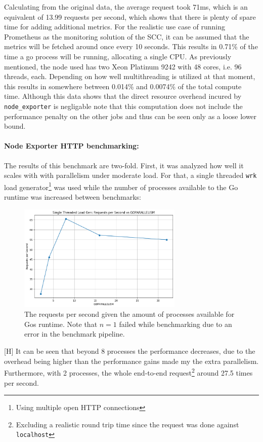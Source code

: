 Calculating from the original data, the average request took 71ms, which is an equivalent of 13.99 requests per second, which shows that there is plenty of spare time for adding additional metrics. For the realistic use case of running Prometheus as the monitoring solution of the \ac{SCC}, it can be assumed that the metrics will be fetched around once every 10 seconds. This results in 0.71\% of the time a go process will be running, allocating a single CPU. As previously mentioned, the node used has two Xeon Platinum 9242 with 48 cores, i.e. 96 threads, each. Depending on how well multithreading is utilized at that moment, this results in somewhere between 0.014\% and 0.0074\% of the total compute time. Although this data shows that the direct resource overhead incured by \texttt{node\_exporter} is negligable note that this computation does not include the performance penalty on the other jobs and thus can be seen only as a loose lower bound.\\

\paragraph{Node Exporter HTTP benchmarking:} The results of this benchmark are two-fold. First, it was analyzed how well it scales with with parallelism under moderate load. For that, a single threaded \texttt{wrk} load generator\footnote{Using multiple open HTTP connections} was used while the number of processes available to the Go runtime was increased between benchmarks:

\begin{figure}[H]
  \centering
  \includegraphics[width=0.7\textwidth]{./plots/node_exporter_performance_per_parallelism.png}
  \caption{The requests per second given the amount of processes available for Gos runtime. Note that $n=1$ failed while benchmarking due to an error in the benchmark pipeline.}
\end{figure}[H]
It can be seen that beyond 8 processes the performance decreases, due to the overhead being higher than the performance gains made my the extra parallelism. Furthermore, with 2 processes, the whole end-to-end request\footnote{Excluding a realistic round trip time since the request was done against \texttt{localhost}} around 27.5 times per second.\\

